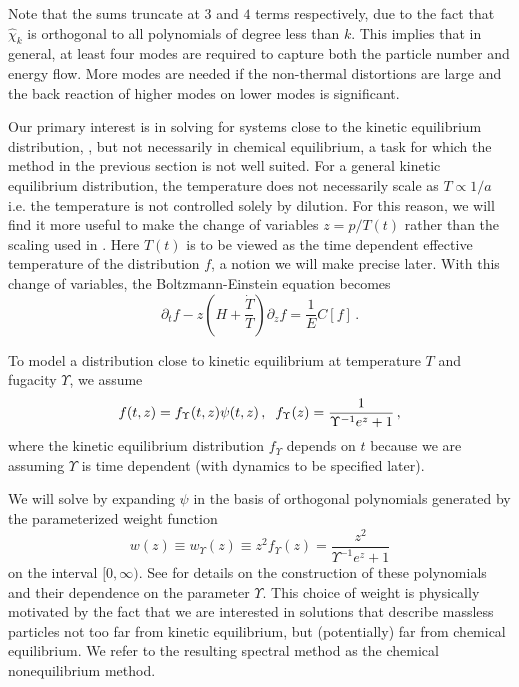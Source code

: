 Note that the sums truncate at $3$ and $4$ terms respectively, due to the fact that $\hat\chi_k$ is orthogonal to all polynomials of degree less than $k$. This implies that in general, at least four modes are required to capture both the particle number and energy flow. More modes are needed if the non-thermal distortions are large and the back reaction of higher modes on lower modes is significant.

Our primary interest is in solving  for systems close to the kinetic equilibrium distribution, , but not necessarily in chemical equilibrium, a task for which the method in the previous section is not well suited. For a general kinetic equilibrium distribution, the temperature does not necessarily scale as $T\propto 1/a$ i.e. the temperature is not controlled solely by dilution.  For this reason, we will find it more useful to make the change of variables $z=p/T(t)$ rather than the scaling used in .  Here $T(t)$ is to be viewed as the time dependent effective temperature of the distribution $f$, a notion we will make precise later.  With this change of variables, the Boltzmann-Einstein equation becomes
\begin{equation}\label{TBoltzmann}
\partial_t f-z\left(H+\frac{\dot T}{T}\right)\partial_z f=\frac{1}{E}C[f]\,.
\end{equation}


To model a distribution close to kinetic equilibrium at temperature $T$ and fugacity $\Upsilon$, we assume
\begin{equation}\label{kineticApprox}
f(t,z)= f_\Upsilon (t,z)\psi(t,z)\,,\hspace{2mm} f_\Upsilon(z)=\frac{1}{\Upsilon^{-1}e^z+1}\,,
\end{equation}
where the kinetic equilibrium distribution $f_\Upsilon $ depends on $t$ because we are assuming $\Upsilon$ is time dependent (with dynamics to be specified later). 

We will solve  by expanding $\psi$ in the basis of orthogonal polynomials generated by the parameterized weight function
\begin{equation}\label{weight}
w(z)\equiv w_\Upsilon(z)\equiv z^2f_\Upsilon (z)=\frac{z^2}{\Upsilon^{-1} e^z+1}
\end{equation}
on the interval $[0,\infty)$. See   for details on the construction of these polynomials and their dependence on the parameter $\Upsilon$. This choice of weight is physically motivated by the fact that we are interested in solutions that describe massless particles not too far from kinetic equilibrium, but (potentially) far from chemical equilibrium. We refer to the resulting spectral method as the chemical nonequilibrium method.

